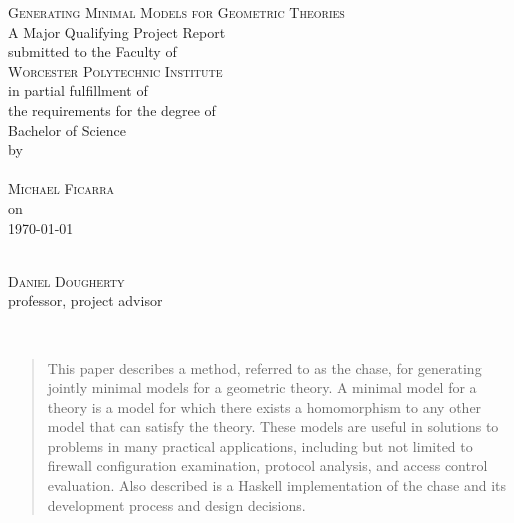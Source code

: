 \documentclass[11pt, a4paper]{article}
\begin{document}
\begin{titlepage}
\begin{center}
	\textsc{\huge Generating Minimal Models for Geometric Theories}\\[1cm]
	A Major Qualifying Project Report\\
	submitted to the Faculty of\\[0.7cm]
	\textsc{ \large Worcester Polytechnic Institute }\\[0.7cm]
	in partial fulfillment of\\
	the requirements for the degree of\\
	Bachelor of Science\\[1cm]
	by\\[1cm]
	~\hspace{2cm}\dotfill\hspace{2cm}~\\
	\textsc{\Large Michael Ficarra}\\[1cm]
	on\\[1cm]
	{\Large \today}\\
	\vfill
	\begin{flushright}
		\hspace{8cm}\dotfill \\
		\textsc{Daniel Dougherty}\\
		professor, project advisor\\
	\end{flushright}
\end{center}
\end{titlepage}



~\\
\vfill
\begin{abstract}
This paper describes a method, referred to as the chase, for generating jointly
minimal models for a geometric theory. A minimal model for a theory is a model
for which there exists a homomorphism to any other model that can satisfy the
theory. These models are useful in solutions to problems in many practical
applications, including but not limited to firewall configuration examination,
protocol analysis, and access control evaluation. Also described is a Haskell
implementation of the chase and its development process and design decisions.
\end{abstract}
\vfill
~\\
\newpage

\renewcommand{\contentsname}{Table of Contents}
\tableofcontents \newpage
\end{document}
